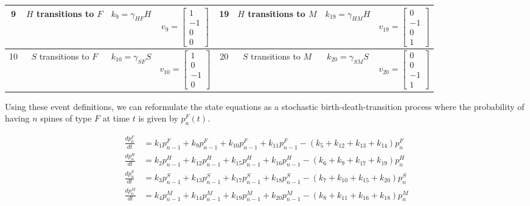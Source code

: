 \documentclass[11pt,letterpaper, onecolumn]{exam}
\begin{document}
\begin{table}[h!]
{\begin{tabular}{|c|c|c|c||c|c|c|c|}
\hline
9 & $H$ transitions to $F$ & $k_9=\gamma_{HF}H$ & $v_9=\begin{bmatrix}1\\-1\\0\\0\end{bmatrix}$ & 19 & $H$ transitions to $M$ & $k_{19}=\gamma_{HM}H$ & $v_{19}=\begin{bmatrix}0\\-1\\0\\1\end{bmatrix}$\\
\hline
10 & $S$ transitions to $F$ & $k_{10}=\gamma_{SF}S$ & $v_{10}=\begin{bmatrix}1\\0\\-1\\0\end{bmatrix}$ & 20 & $S$ transitions to $M$ & $k_{20}=\gamma_{SM}S$ & $v_20=\begin{bmatrix}0\\0\\-1\\1\end{bmatrix}$\\
\hline
\end{tabular}}
\end{table}

Using these event definitions, we can reformulate the state equations as a stochastic birth-death-transition process where the probability of having $n$ spines of type $F$ at time $t$ is given by $p_n^{F}(t)$.

\begin{equation}
\begin{split}
\frac{dp_n^F}{dt} &= k_1p_{n-1}^F + k_9p_{n-1}^F + k_{10}p_{n-1}^F + k_{11}p_{n-1}^F - (k_5 + k_{12} + k_{13} + k_{14})p_n^F \\
\frac{dp_n^H}{dt} &= k_2p_{n-1}^H + k_{12}p_{n-1}^H + k_{15}p_{n-1}^H + k_{16}p_{n-1}^H- (k_6 + k_9 + k_{17} + k_{19})p_n^H \\
\frac{dp_n^S}{dt} &= k_3p_{n-1}^S + k_{13}p_{n-1}^S + k_{17}p_{n-1}^S + k_{18}p_{n-1}^S - (k_7 + k_{10} + k_{15} + k_{20})p_n^S \\
\frac{dp_n^M}{dt} &= k_4p_{n-1}^M+ k_{14}p_{n-1}^M + k_{19}p_{n-1}^M+ k_{20}p_{n-1}^M- (k_8 + k_{11} + k_{16} + k_{18})p_n^M\\
\end{split}
\end{equation}
\end{document}
